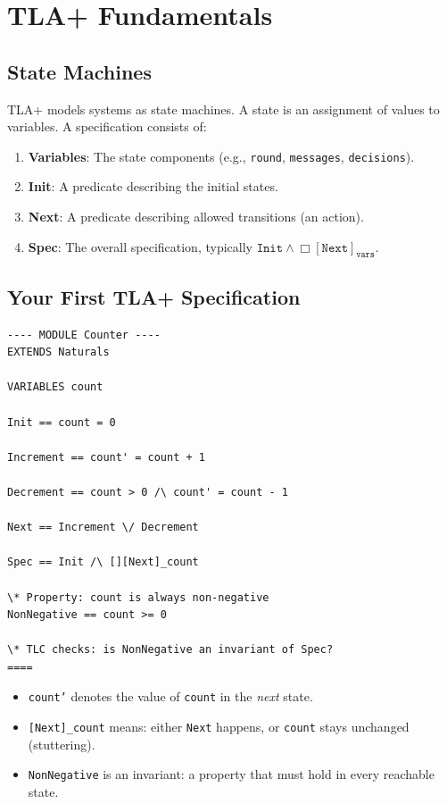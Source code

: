 \section{TLA+ Fundamentals}


\subsection{State Machines}

TLA+ models systems as state machines. A state is an assignment of values to variables.
A specification consists of:

\begin{enumerate}[nosep]
  \item \textbf{Variables}: The state components (e.g., \texttt{round}, \texttt{messages},
    \texttt{decisions}).
  \item \textbf{Init}: A predicate describing the initial states.
  \item \textbf{Next}: A predicate describing allowed transitions (an action).
  \item \textbf{Spec}: The overall specification, typically $\texttt{Init} \wedge \Box[\texttt{Next}]_{\texttt{vars}}$.
\end{enumerate}

\subsection{Your First TLA+ Specification}

\begin{lstlisting}[language=TLA,caption={A simple counter in TLA+}]
---- MODULE Counter ----
EXTENDS Naturals

VARIABLES count

Init == count = 0

Increment == count' = count + 1

Decrement == count > 0 /\ count' = count - 1

Next == Increment \/ Decrement

Spec == Init /\ [][Next]_count

\* Property: count is always non-negative
NonNegative == count >= 0

\* TLC checks: is NonNegative an invariant of Spec?
====
\end{lstlisting}

\begin{itemize}[nosep]
  \item \texttt{count'} denotes the value of \texttt{count} in the \emph{next} state.
  \item \texttt{[Next]\_count} means: either \texttt{Next} happens, or \texttt{count}
    stays unchanged (stuttering).
  \item \texttt{NonNegative} is an invariant: a property that must hold in every reachable
    state.
\end{itemize}

